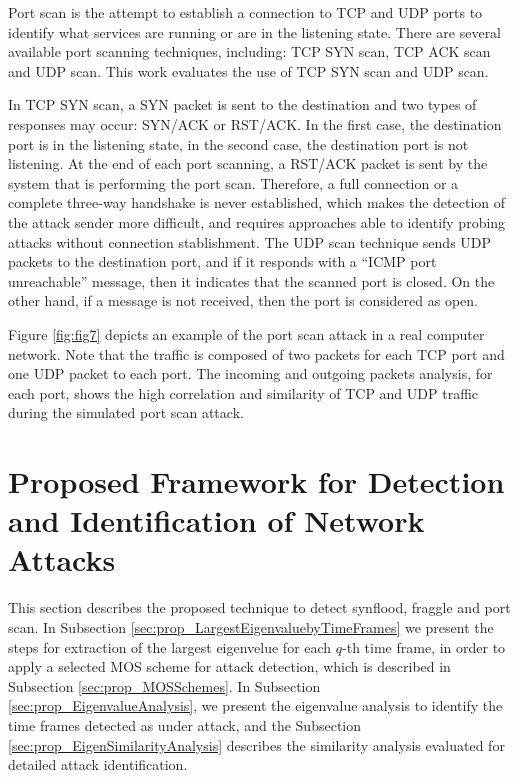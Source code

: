 \documentclass{bmcart}
\begin{document}
Port scan is the attempt to establish a connection to TCP and UDP ports to identify what services are running or are in the listening state. There are several available port scanning techniques, including: TCP SYN scan, TCP ACK scan and UDP scan. This work evaluates the use of TCP SYN scan and UDP scan. 

In TCP SYN scan, a SYN packet is sent to the destination and two types of responses may occur: SYN/ACK or RST/ACK. In the first case, the destination port is in the listening state, in the second case, the destination port is not listening. At the end of each port scanning, a RST/ACK packet is sent by the system that is performing the port  scan. Therefore, a full connection or a complete three-way handshake is never established, which makes the detection of the attack sender more difficult, and requires approaches able to identify probing attacks without connection stablishment. The UDP scan technique sends UDP packets to the destination port, and if it responds with a ``ICMP port unreachable'' message, then it indicates that the scanned port is closed. On the other hand, if a message is not received, then the port is considered as open.


Figure \ref{fig:fig7} depicts an example of the port scan attack in a real computer network. Note that the traffic is composed of two packets for each TCP port and one UDP packet to each port. The incoming and outgoing packets analysis, for each port, shows the high correlation and similarity of TCP and UDP traffic during the simulated port scan attack.


\section{Proposed Framework for Detection and Identification of Network Attacks}
\label{sec:prop_getv}

This section describes the proposed technique to detect synflood, fraggle and port scan. In Subsection \ref{sec:prop_LargestEigenvaluebyTimeFrames} we present the steps for extraction of the largest eigenvelue for each $q$-th time frame, in order to apply a selected MOS scheme for attack detection, which is described in Subsection \ref{sec:prop_MOSSchemes}. In Subsection \ref{sec:prop_EigenvalueAnalysis}, we present the eigenvalue analysis to identify the time frames detected as under attack, and the Subsection \ref{sec:prop_EigenSimilarityAnalysis} describes the similarity analysis evaluated for detailed attack identification.
\end{document}
